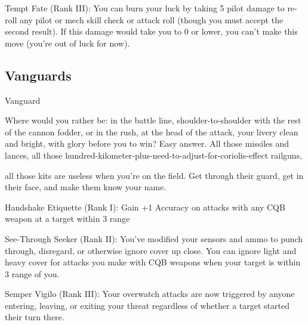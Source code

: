 Tempt Fate (Rank III): You can burn your luck by taking 5 pilot damage to re-roll any pilot or  
mech skill check or attack roll (though you must accept the second result). If this damage would  
take you to 0 or lower, you can’t make this move (you’re out of luck for now).  
\subsection{Vanguards}
                                                   Vanguard  

Where would you rather be: in the battle line, shoulder-to-shoulder with the rest of the cannon fodder, or in  
the rush, at the head of the attack, your livery clean and bright, with glory before you to win? Easy answer.  
All those missiles and lances, all those hundred-kilometer-plus-need-to-adjust-for-coriolis-effect railguns,  

all those kits are useless when you’re on the field. Get through their guard, get in their face, and make them  
know your name.   

Handshake Etiquette (Rank I): Gain +1 Accuracy on attacks with any CQB weapon at a target  
within 3 range
 
See-Through Seeker (Rank II): You’ve modified your sensors and ammo to punch through,  
disregard, or otherwise ignore cover up close. You can ignore light and heavy cover for attacks  
you make with CQB weapons when your target is within 3 range of you.
 
Semper Vigilo (Rank III): Your overwatch attacks are now triggered by anyone entering, leaving,  
or exiting your threat regardless of whether a target started their turn there.
 

                                                                                                                  

